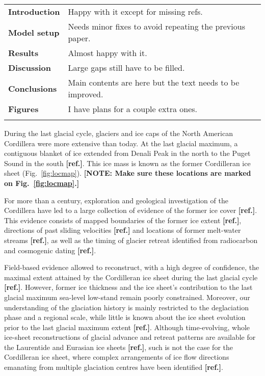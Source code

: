 \documentclass[tc, ms]{copernicus}
\newcommand{\note}[1]{\textbf{[NOTE: #1]}}
\newcommand{\aref}[0]{\textbf{[ref.]}}
\begin{document}
\begin{center}
\begin{tabular}{>{\bfseries}ll}
    \tophline
    Introduction & Happy with it except for missing refs.\\
    Model setup  & Needs minor fixes to avoid repeating the previous paper.\\
    Results      & Almost happy with it. \\
    Discussion   & Large gaps still have to be filled.\\
    Conclusions  & Main contents are here but the text needs to be improved.\\
    Figures      & I have plans for a couple extra ones.\\
    \bottomhline
\end{tabular}
\end{center}

\introduction
\label{sec:intro}

During the last glacial cycle, glaciers and ice caps of the North American
Cordillera were more extensive than today. At the last glacial maximum, a
contiguous blanket of ice extended from Denali Peak in the north to the Puget
Sound in the south \aref. This ice mass is known as the former Cordilleran ice
sheet (Fig.~\ref{fig:locmap}).
\note{Make sure these locations are marked on Fig.~\ref{fig:locmap}.}

For more than a century, exploration and geological investigation of the
Cordillera have led to a large collection of evidence of the former ice cover \aref. This
evidence consists of mapped boundaries of the former ice extent \aref, directions of
past sliding velocities {\aref} and locations of former melt-water streams \aref, as well as
the timing of glacier retreat identified from radiocarbon and cosmogenic dating \aref.

Field-based evidence allowed to reconstruct, with a high degree of confidence,
the maximal extent attained by the Cordilleran ice sheet during the last glacial
cycle \aref. However, former ice thickness and the ice sheet's contribution to the
last glacial maximum sea-level low-stand remain poorly constrained. Moreover,
our understanding of the glaciation history is mainly restricted to the
deglaciation phase and a regional scale, while little is known about the ice
sheet evolution prior to the last glacial maximum extent \aref. Although
time-evolving, whole ice-sheet reconstructions of glacial advance and retreat
patterns are available for the Laurentide and Eurasian ice sheets \aref, such is not
the case for the Cordilleran ice sheet, where complex arrangements of ice flow
directions emanating from multiple glaciation centres have been identified \aref.
\end{document}
